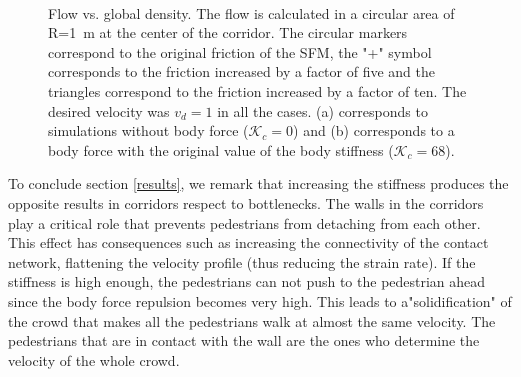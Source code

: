 \documentclass[preprint,12pt]{elsarticle}
\begin{document}
\begin{figure}[!htbp]
\centering
    \ 
    \\
\caption[width=0.47\columnwidth]{Flow vs. global density. The flow is calculated in a circular area of R=1~m at the center of the corridor. The circular markers correspond to the original friction of the SFM, the "+" symbol corresponds to the friction increased by a factor of five and the triangles correspond to the friction increased by a factor of ten. The desired velocity was $v_d=1$ in all the cases. (a) corresponds to simulations without body force ($\mathcal{K}_c =$0) and (b) corresponds to a body force with the original value of the body stiffness ($\mathcal{K}_c =$68).}
\label{flow_density}
\end{figure}


To conclude section \ref{results}, we remark that increasing the stiffness produces the opposite results in corridors respect to bottlenecks. The walls in the corridors play a critical role that prevents pedestrians from detaching from each other. This effect has consequences such as increasing the connectivity of the contact network, flattening the velocity profile (thus reducing the strain rate). If the stiffness is high enough, the pedestrians can not push to the pedestrian ahead since the body force repulsion becomes very high. This leads to a"solidification" of the crowd that makes all the pedestrians walk at almost the same velocity. The pedestrians that are in contact with the wall are the ones who determine the velocity of the whole crowd. \\
\end{document}
